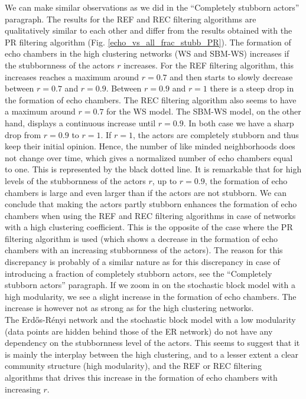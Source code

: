 \documentclass[11 pt , letterpaper , twoside , openright]{book}
\begin{document}
We can make similar observations as we did in the ``Completely stubborn actors'' paragraph. The results for the REF and REC filtering algorithms are qualitatively similar to each other and differ from the results obtained with the PR filtering algorithm (Fig. \ref{echo_vs_all_frac_stubb_PR}). The formation of echo chambers in the high clustering networks (WS and SBM-WS) increases if the stubbornness of the actors $r$ increases. For the REF filtering algorithm, this increases reaches a maximum around $r = 0.7$ and then starts to slowly decrease between $r = 0.7$ and $r = 0.9$. Between $r = 0.9$ and $r=1$ there is a steep drop in the formation of echo chambers. The REC filtering algorithm also seems to have a maximum around $r = 0.7$ for the WS model. The SBM-WS model, on the other hand, displays a continuous increase until $r = 0.9$. In both case we have a sharp drop from $r = 0.9$ to $r=1$. If $r=1$, the actors are completely stubborn and thus keep their initial opinion. Hence, the number of like minded neighborhoods does not change over time, which gives a normalized number of echo chambers equal to one. This is represented by the black dotted line. It is remarkable that for high levels of the stubbornness of the actors $r$, up to $r = 0.9$, the formation of echo chambers is large and even larger than if the actors are not stubborn. We can conclude that making the actors partly stubborn enhances the formation of echo chambers when using the REF and REC filtering algorithms in case of networks with a high clustering coefficient. This is the opposite of the case where the PR filtering algorithm is used (which shows a decrease in the formation of echo chambers with an increasing stubbornness of the actors). The reason for this discrepancy is probably of a similar nature as for this discrepancy in case of introducing a fraction of completely stubborn actors, see the ``Completely stubborn actors'' paragraph. If we zoom in on the stochastic block model with a high modularity, we see a slight increase in the formation of echo chambers. The increase is however not as strong as for the high clustering networks.\\
\newline
The Erd\H{o}s-R\'{e}nyi network and the stochastic block model with a low modularity (data points are hidden behind those of the ER network) do not have any dependency on the stubbornness level of the actors. This seems to suggest that it is mainly the interplay between the high clustering, and to a lesser extent a clear community structure (high modularity), and the REF or REC filtering algorithms that drives this increase in the formation of echo chambers with increasing $r$. %
\end{document}
